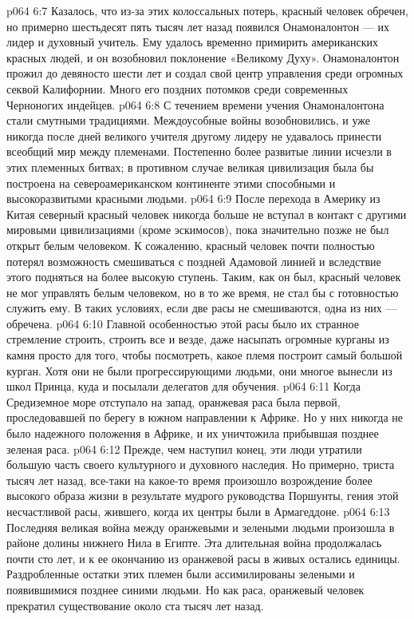 \vs p064 6:7 Казалось, что из\hyp{}за этих колоссальных потерь, красный человек обречен, но примерно шестьдесят пять тысяч лет назад появился Онамоналонтон --- их лидер и духовный учитель. Ему удалось временно примирить американских красных людей, и он возобновил поклонение «Великому Духу». Онамоналонтон прожил до девяносто шести лет и создал свой центр управления среди огромных секвой Калифорнии. Много его поздних потомков среди современных Черноногих индейцев.
\vs p064 6:8 С течением времени учения Онамоналонтона стали смутными традициями. Междоусобные войны возобновились, и уже никогда после дней великого учителя другому лидеру не удавалось принести всеобщий мир между племенами. Постепенно более развитые линии исчезли в этих племенных битвах; в противном случае великая цивилизация была бы построена на североамериканском континенте этими способными и высокоразвитыми красными людьми.
\vs p064 6:9 После перехода в Америку из Китая северный красный человек никогда больше не вступал в контакт с другими мировыми цивилизациями (кроме эскимосов), пока значительно позже не был открыт белым человеком. К сожалению, красный человек почти полностью потерял возможность смешиваться с поздней Адамовой линией и вследствие этого подняться на более высокую ступень. Таким, как он был, красный человек не мог управлять белым человеком, но в то же время, не стал бы с готовностью служить ему. В таких условиях, если две расы не смешиваются, одна из них --- обречена.
\vs p064 6:10 \pc {}\bibnobreakspace {} Главной особенностью этой расы было их странное стремление строить, строить все и везде, даже насыпать огромные курганы из камня просто для того, чтобы посмотреть, какое племя построит самый большой курган. Хотя они не были прогрессирующими людьми, они многое вынесли из школ Принца, куда и посылали делегатов для обучения.
\vs p064 6:11 Когда Средиземное море отступало на запад, оранжевая раса была первой, проследовавшей по берегу в южном направлении к Африке. Но у них никогда не было надежного положения в Африке, и их уничтожила прибывшая позднее зеленая раса.
\vs p064 6:12 Прежде, чем наступил конец, эти люди утратили большую часть своего культурного и духовного наследия. Но примерно, триста тысяч лет назад, все\hyp{}таки на какое\hyp{}то время произошло возрождение более высокого образа жизни в результате мудрого руководства Поршунты, гения этой несчастливой расы, жившего, когда их центры были в Армагеддоне.
\vs p064 6:13 Последняя великая война между оранжевыми и зелеными людьми произошла в районе долины нижнего Нила в Египте. Эта длительная война продолжалась почти сто лет, и к ее окончанию из оранжевой расы в живых остались единицы. Раздробленные остатки этих племен были ассимилированы зелеными и появившимися позднее синими людьми. Но как раса, оранжевый человек прекратил существование около ста тысяч лет назад.
